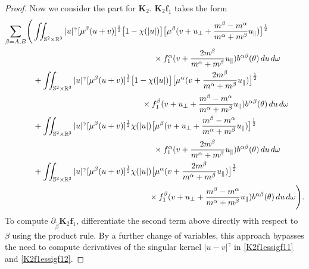 \documentclass[reqno]{amsart}
\numberwithin{equation}{section}
\numberwithin{equation}{section}
\begin{document}
\begin{proof}
		Now we consider the part for $\mathbf{K}_2$. $\mathbf{K}_2\mathbf{f}_1$ takes the form
		\begin{align}
			\sum_{\beta=A,B}&\Bigg(\iint_{\mathbb{S}^2\times\mathbb{R}^3} |u|^{\gamma} [\mu^{\beta}(u+v)]^{\frac{1}{2}}\big[1-\chi(|u|)\big]\big[\mu^{\beta}(v + u_{\perp}+\frac{m^{\beta}-m^{\alpha}}{m^{\alpha}+m^{\beta}}u_{\parallel})\big]^{\frac{1}{2}}\label{K2f1essigf11}\\
			&\hspace{5.5cm}\times f^\alpha_1(v + \frac{2m^{\beta}}{m^{\alpha}+m^{\beta}}u_{\parallel})b^{ \alpha \beta}(\theta) \, du \, d\omega \notag\\
			&\hspace{0.3cm}+ \iint_{\mathbb{S}^2\times\mathbb{R}^3} |u|^{\gamma} [\mu^{\beta}(u+v)]^{\frac{1}{2}}\big[1-\chi(|u|)\big]\big[\mu^{\alpha}(v + \frac{2m^{\beta}}{m^{\alpha}+m^{\beta}}u_{\parallel})\big]^{\frac{1}{2}}\label{K2f1essigf12}\\
			&\hspace{5cm}\times f^\beta_1(v + u_{\perp}+\frac{m^{\beta}-m^{\alpha}}{m^{\alpha}+m^{\beta}}u_{\parallel})b^{ \alpha \beta}(\theta) \, du \, d\omega \notag\\
			&\hspace{0.3cm}+\iint_{\mathbb{S}^2\times\mathbb{R}^3} |u|^{\gamma} [\mu^{\beta}(u+v)]^{\frac{1}{2}}\chi(|u|)\big[\mu^{\beta}(v + u_{\perp}+\frac{m^{\beta}-m^{\alpha}}{m^{\alpha}+m^{\beta}}u_{\parallel})\big]^{\frac{1}{2}}\label{K2f1etssigf13}\\
			&\hspace{5.5cm}\times f^\alpha_1(v + \frac{2m^{\beta}}{m^{\alpha}+m^{\beta}}u_{\parallel})b^{ \alpha \beta}(\theta) \, du \, d\omega \notag\\
			&\hspace{0.3cm}+ \iint_{\mathbb{S}^2\times\mathbb{R}^3} |u|^{\gamma} [\mu^{\beta}(u+v)]^{\frac{1}{2}}\chi(|u|)\big[\mu^{\alpha}(v + \frac{2m^{\beta}}{m^{\alpha}+m^{\beta}}u_{\parallel})\big]^{\frac{1}{2}}\label{K2f1ressigf14}\\
			&\hspace{5.3cm}\times f^\beta_1(v + u_{\perp}+\frac{m^{\beta}-m^{\alpha}}{m^{\alpha}+m^{\beta}}u_{\parallel})b^{ \alpha \beta}(\theta) \, du \, d\omega \Bigg). \notag
		\end{align}
		To compute $\partial_{\tilde{\beta}} \mathbf{K}_2\mathbf{f}_1$, differentiate the second term above directly with respect to $\beta$ using the product rule. By a further change of variables, this approach bypasses the need to compute derivatives of the singular kernel $|u - v|^\gamma$ in \eqref{K2f1essigf11} and \eqref{K2f1essigf12}. 

\end{proof}
\end{document}
